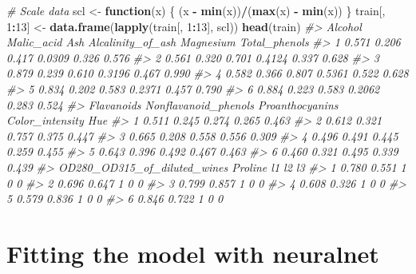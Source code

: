 \documentclass[]{book}
\newenvironment{Shaded}{\begin{snugshade}}{\end{snugshade}}
\newcommand{\CommentTok}[1]{\textcolor[rgb]{0.56,0.35,0.01}{\textit{#1}}}
\newcommand{\ControlFlowTok}[1]{\textcolor[rgb]{0.13,0.29,0.53}{\textbf{#1}}}
\newcommand{\DecValTok}[1]{\textcolor[rgb]{0.00,0.00,0.81}{#1}}
\newcommand{\KeywordTok}[1]{\textcolor[rgb]{0.13,0.29,0.53}{\textbf{#1}}}
\newcommand{\NormalTok}[1]{#1}
\newcommand{\OperatorTok}[1]{\textcolor[rgb]{0.81,0.36,0.00}{\textbf{#1}}}
\newcommand{\StringTok}[1]{\textcolor[rgb]{0.31,0.60,0.02}{#1}}
\begin{document}
\begin{Shaded}
\begin{Highlighting}[]
\CommentTok{# Scale data}
\NormalTok{scl <-}\StringTok{ }\ControlFlowTok{function}\NormalTok{(x) \{ (x }\OperatorTok{-}\StringTok{ }\KeywordTok{min}\NormalTok{(x))}\OperatorTok{/}\NormalTok{(}\KeywordTok{max}\NormalTok{(x) }\OperatorTok{-}\StringTok{ }\KeywordTok{min}\NormalTok{(x)) \}}
\NormalTok{train[, }\DecValTok{1}\OperatorTok{:}\DecValTok{13}\NormalTok{] <-}\StringTok{ }\KeywordTok{data.frame}\NormalTok{(}\KeywordTok{lapply}\NormalTok{(train[, }\DecValTok{1}\OperatorTok{:}\DecValTok{13}\NormalTok{], scl))}
\KeywordTok{head}\NormalTok{(train)}
\CommentTok{#>   Alcohol Malic_acid   Ash Alcalinity_of_ash Magnesium Total_phenols}
\CommentTok{#> 1   0.571      0.206 0.417            0.0309     0.326         0.576}
\CommentTok{#> 2   0.561      0.320 0.701            0.4124     0.337         0.628}
\CommentTok{#> 3   0.879      0.239 0.610            0.3196     0.467         0.990}
\CommentTok{#> 4   0.582      0.366 0.807            0.5361     0.522         0.628}
\CommentTok{#> 5   0.834      0.202 0.583            0.2371     0.457         0.790}
\CommentTok{#> 6   0.884      0.223 0.583            0.2062     0.283         0.524}
\CommentTok{#>   Flavanoids Nonflavanoid_phenols Proanthocyanins Color_intensity   Hue}
\CommentTok{#> 1      0.511                0.245           0.274           0.265 0.463}
\CommentTok{#> 2      0.612                0.321           0.757           0.375 0.447}
\CommentTok{#> 3      0.665                0.208           0.558           0.556 0.309}
\CommentTok{#> 4      0.496                0.491           0.445           0.259 0.455}
\CommentTok{#> 5      0.643                0.396           0.492           0.467 0.463}
\CommentTok{#> 6      0.460                0.321           0.495           0.339 0.439}
\CommentTok{#>   OD280_OD315_of_diluted_wines Proline l1 l2 l3}
\CommentTok{#> 1                        0.780   0.551  1  0  0}
\CommentTok{#> 2                        0.696   0.647  1  0  0}
\CommentTok{#> 3                        0.799   0.857  1  0  0}
\CommentTok{#> 4                        0.608   0.326  1  0  0}
\CommentTok{#> 5                        0.579   0.836  1  0  0}
\CommentTok{#> 6                        0.846   0.722  1  0  0}
\end{Highlighting}
\end{Shaded}

\hypertarget{fitting-the-model-with-neuralnet}{%
\section{Fitting the model with neuralnet}\label{fitting-the-model-with-neuralnet}}
\end{document}
